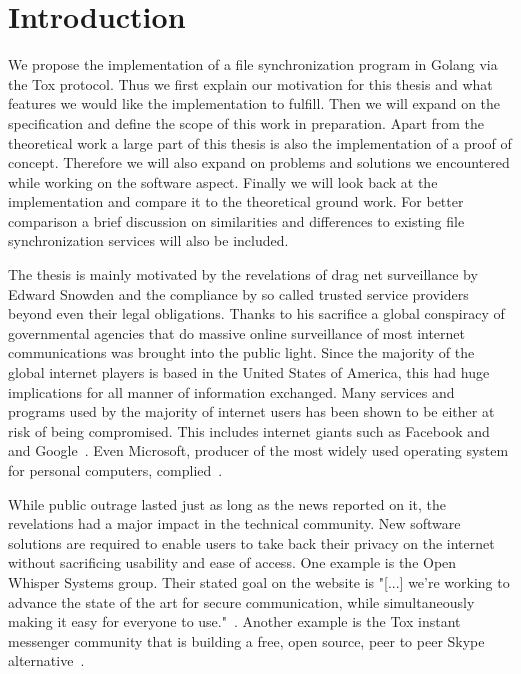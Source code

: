 \chapter{Introduction}
\label{chap:Introduction}

We propose the implementation of a file synchronization program in Golang via the Tox protocol.
Thus we first explain our motivation for this thesis and what features we would like the implementation to fulfill.
Then we will expand on the specification and define the scope of this work in preparation.
Apart from the theoretical work a large part of this thesis is also the implementation of a proof of concept.
Therefore we will also expand on problems and solutions we encountered while working on the software aspect.
Finally we will look back at the implementation and compare it to the theoretical ground work.
For better comparison a brief discussion on similarities and differences to existing file synchronization services will also be included.

\label{sec:Motivation}

The thesis is mainly motivated by the revelations of drag net surveillance by Edward Snowden and the compliance by so called trusted service providers beyond even their legal obligations.
Thanks to his sacrifice a global conspiracy of governmental agencies that do massive online surveillance of most internet communications was brought into the public light.
Since the majority of the global internet players is based in the United States of America, this had huge implications for all manner of information exchanged.
Many services and programs used by the majority of internet users has been shown to be either at risk of being compromised.
This includes internet giants such as Facebook and and Google~\cite{web:site:tg:internet_giants}.
Even Microsoft, producer of the most widely used operating system for personal computers, complied~\cite{web:site:tg:microsoft}.

While public outrage lasted just as long as the news reported on it, the revelations had a major impact in the technical community.
New software solutions are required to enable users to take back their privacy on the internet without sacrificing usability and ease of access.
One example is the Open Whisper Systems group.
Their stated goal on the website is "[...] we're working to advance the state of the art for secure communication, while simultaneously making it easy for everyone to use."~\cite{web:site:whispersystems}.
Another example is the Tox instant messenger community that is building a free, open source, peer to peer Skype alternative~\cite{web:site:tox}.

